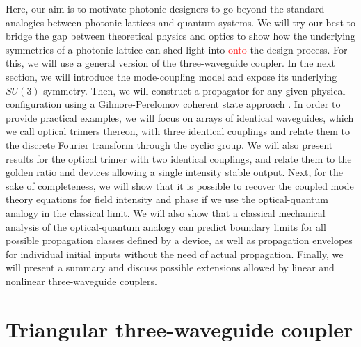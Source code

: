 \documentclass[9pt,twocolumn,twoside]{osajnl}
\begin{document}
Here, our aim is to motivate photonic designers to go beyond the standard analogies between photonic lattices and quantum systems. 
We will try our best to bridge the gap between theoretical physics and optics to show how the underlying symmetries of a photonic lattice can shed light into \textcolor{red}{onto} the design process. 
For this, we will use a general version of the three-waveguide coupler.
In the next section, we will introduce the mode-coupling model and expose its underlying $SU(3)$ symmetry. 
Then, we will construct a propagator for any given physical configuration using a Gilmore-Perelomov coherent state approach \cite{VillanuevaVergara2015p}.
In order to provide practical examples, we will focus on arrays of identical waveguides, which we call optical trimers thereon, with three identical couplings and relate them to the discrete Fourier transform through the cyclic group.
We will also present results for the optical trimer with two identical couplings, and relate them to the golden ratio and devices allowing a single intensity stable output. 
Next, for the sake of completeness, we will show that it is possible to recover the coupled mode theory equations for field intensity and phase if we use the optical-quantum analogy in the classical limit.
We will also show that a classical mechanical analysis of the optical-quantum analogy can predict boundary limits for all possible propagation classes defined by a device, as well as propagation envelopes for individual initial inputs without the need of actual propagation.
Finally, we will present a summary and discuss possible extensions allowed by linear and nonlinear three-waveguide couplers.


\section{Triangular three-waveguide coupler}
\end{document}
